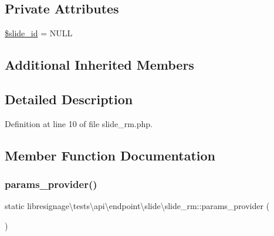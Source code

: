 \subsection*{Private Attributes}
\begin{DoxyCompactItemize}
\item 
\hyperlink{classlibresignage_1_1tests_1_1api_1_1endpoint_1_1slide_1_1slide__rm_a42a7d396f91e38e20cab9bfaa67f6cd7}{\$slide\+\_\+id} = N\+U\+LL
\end{DoxyCompactItemize}
\subsection*{Additional Inherited Members}


\subsection{Detailed Description}


Definition at line 10 of file slide\+\_\+rm.\+php.



\subsection{Member Function Documentation}
\mbox{\label{classlibresignage_1_1tests_1_1api_1_1endpoint_1_1slide_1_1slide__rm_a04a73421fcc72354b3e3ce4a5d900c38}} 
\subsubsection{\texorpdfstring{params\+\_\+provider()}{params\_provider()}}
{\footnotesize\ttfamily static libresignage\textbackslash{}tests\textbackslash{}api\textbackslash{}endpoint\textbackslash{}slide\textbackslash{}slide\+\_\+rm\+::params\+\_\+provider (\begin{DoxyParamCaption}{ }\end{DoxyParamCaption})\hspace{0.3cm}{\ttfamily [static]}}



